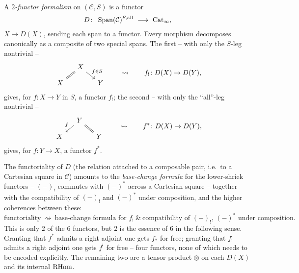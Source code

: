 \begin{definition}
\label{def:17:2ff}
A \emph{$2$-functor formalism} on $(\mathcal C,S)$ is a functor
\begin{equation}
\label{eq:17:2ff}
D\colon\ \Span(\mathcal C)^{S,\mathrm{all}}\ \longrightarrow\ \Catinf,
\end{equation}
$X\mapsto D(X)$, sending each span to a functor. Every morphism decomposes canonically as
a composite of two special spans. The first -- with only the $S$-leg nontrivial --
\begin{equation}
\label{eq:17:2ff-shriek}
\begin{tikzcd}[column sep=small, row sep=small]
& X \arrow[dl, equal] \arrow[dr, "f\in S"] & \\
X & & Y
\end{tikzcd}
\qquad\rightsquigarrow\qquad f_{!}\colon D(X)\to D(Y),
\end{equation}
gives, for $f\colon X\to Y$ in $S$, a functor $f_{!}$; the second -- with only the
``all''-leg nontrivial --
\begin{equation}
\label{eq:17:2ff-star}
\begin{tikzcd}[column sep=small, row sep=small]
& Y \arrow[dl, "f"'] \arrow[dr, equal] & \\
X & & Y
\end{tikzcd}
\qquad\rightsquigarrow\qquad f^{*}\colon D(X)\to D(Y),
\end{equation}
gives, for $f\colon Y\to X$, a functor $f^{*}$.
\end{definition}

\begin{remark}
\label{rmk:17:two-of-six}
The functoriality of $D$ (the relation attached to a composable pair, i.e.\ to a Cartesian
square in $\mathcal C$) amounts to the \emph{base-change formula} for the lower-shriek
functors -- $(-)_{!}$ commutes with $(-)^{*}$ across a Cartesian square -- together with the
compatibility of $(-)_{!}$ and $(-)^{*}$ under composition, and the higher coherences
between these:
\begin{equation*}
\text{functoriality}\ \rightsquigarrow\ \text{base-change formula for }f_{!}\ \&\
\text{compatibility of }(-)_{!},\,(-)^{*}\text{ under composition.}
\end{equation*}
This is only $2$ of the $6$ functors, but $2$ is the essence of $6$ in the following sense.
Granting that $f^{*}$ admits a right adjoint one gets $f_{*}$ for free; granting that
$f_{!}$ admits a right adjoint one gets $f^{!}$ for free -- four functors, none of which
needs to be encoded explicitly. The remaining two are a tensor product $\otimes$ on each
$D(X)$ and its internal $\mathrm{RHom}$.
\end{remark}

